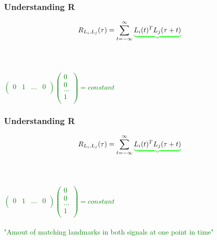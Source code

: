 \documentclass{beamer}
\begin{document}
\begin{frame}
\frametitle{Understanding R}
\begin{displaymath}
R_{  L_i,L_j  }(\tau)=  \sum_{t = -\infty}^{\infty} \textcolor{green}{ \underbrace{ \textcolor{black}{ L_i(t)^T L_j(\tau +t)} }}
\end{displaymath}
\ \\
\ \\
\begin{center}
\textcolor{green}{
$
\begin{pmatrix}
0 & 1 & ... & 0 \\
\end{pmatrix}
\left( \begin{array}{c}
0\\
0\\
...\\
1\\
\end{array}
\right)
= constant
$
}
\end{center}
\end{frame}




\begin{frame}
\frametitle{Understanding R}
\begin{displaymath}
R_{  L_i,L_j  }(\tau)=  \sum_{t = -\infty}^{\infty} \textcolor{green}{ \underbrace{ \textcolor{black}{ L_i(t)^T L_j(\tau +t)} }}
\end{displaymath}
\ \\
\ \\
\begin{center}
\textcolor{green}{
$
\begin{pmatrix}
0 & 1 & ... & 0 \\
\end{pmatrix}
\left( \begin{array}{c}
0\\
0\\
...\\
1\\
\end{array}
\right)
= constant
$
}
\ \\
\ \\
\textcolor{green}{"Amout of matching landmarks in both signals at one point in time"}
\end{center}
\end{frame}
\end{document}
